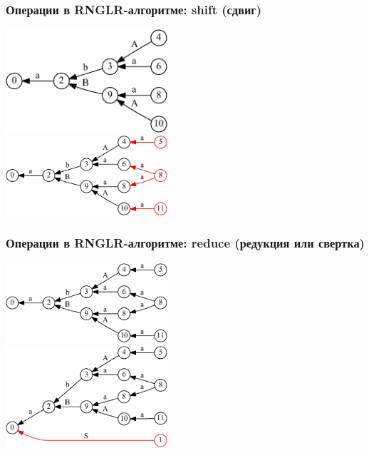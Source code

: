\documentclass{beamer}
\begin{document}
\begin{frame}
  \transwipe[direction=90]
  \frametitle{Операции в RNGLR-алгоритме: shift (сдвиг)}
  \begin{center}
  \includegraphics[width=6cm]{pictures/gss_rnglr_shift_1} \\ \vspace{10pt} 
  \pause
  \includegraphics[width=6cm]{pictures/gss_rnglr_shift_2}
  \end{center}
\end{frame}

\begin{frame}
  \transwipe[direction=90]
  \frametitle{Операции в RNGLR-алгоритме: reduce (редукция или свертка)}
  \begin{center}
  \includegraphics[width=6cm]{pictures/gss_rnglr_reduce_1} \\  \vspace{10pt}
  \pause
  \includegraphics[width=6cm]{pictures/gss_rnglr_reduce_2}
  \end{center}
\end{frame}
\end{document}
